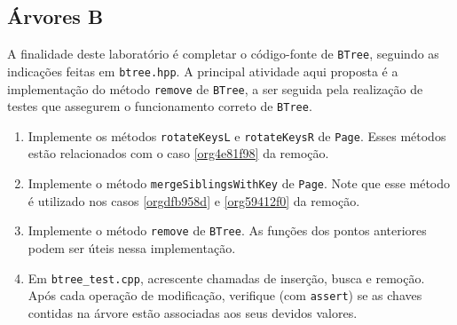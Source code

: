 \documentclass[11pt]{article}
\begin{document}
\subsection{Árvores B}
\label{sec:org3a7f709}

A finalidade deste laboratório é completar o código-fonte de
\texttt{BTree}, seguindo as indicações feitas em \texttt{btree.hpp}.  A principal
atividade aqui proposta é a implementação do método \texttt{remove} de
\texttt{BTree}, a ser seguida pela realização de testes que assegurem o
funcionamento correto de \texttt{BTree}.

\begin{enumerate}
\item Implemente os métodos \texttt{rotateKeysL} e \texttt{rotateKeysR} de \texttt{Page}.
Esses métodos estão relacionados com o caso
\ref{org4e81f98} da remoção.
\item Implemente o método \texttt{mergeSiblingsWithKey} de \texttt{Page}.  Note que
esse método é utilizado nos casos \ref{orgdfb958d} e
\ref{org59412f0} da remoção.
\item Implemente o método \texttt{remove} de \texttt{BTree}.  As funções dos pontos
anteriores podem ser úteis nessa implementação.
\item Em \texttt{btree\_test.cpp}, acrescente chamadas de inserção, busca e
remoção.  Após cada operação de modificação, verifique (com
\texttt{assert}) se as chaves contidas na árvore estão associadas aos
seus devidos valores.
\end{enumerate}
\end{document}
